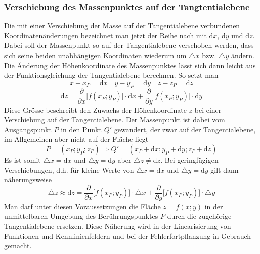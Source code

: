 \subsubsection{Verschiebung des Massenpunktes auf der Tangtentialebene}
Die mit einer Verschiebung der Masse auf der Tangentialebene verbundenen Koordinatenänderungen bezeichnet man jetzt der Reihe nach mit $\text{d}x$, $\text{d}y$ und $\text{d}z$. Dabei soll der Massenpunkt so auf der Tangentialebene verschoben werden, dass sich seine beiden unabhängigen Koordinaten wiederum um $\triangle x$ bzw. $\triangle y$ ändern.
\newline\newline 
Die Änderung der Höhenkoordinate des Massenpunktes lässt sich dann leicht aus der Funktionsgleichung der Tangentialebene berechnen. So setzt man
\begin{equation}
\boxed{x-x_P=\text{d}x}\quad \boxed{y-y_P=\text{d}y}\quad \boxed{z-z_P=\text{d}z}
\end{equation}
\begin{equation}
\boxed{\text{d}z=\dfrac{\partial}{\partial x}\Big[f\left(x_P; y_P\right)\Big]\cdot \text{d}x+\dfrac{\partial}{\partial y}\Big[f\left(x_P; y_P\right)\Big]\cdot \text{d}y}
\end{equation}
Diese Grösse beschreibt den Zuwachs der Höhenkoordinate $z$ bei einer Verschiebung auf der Tangentialebene. Der Massenpunkt ist dabei vom Ausgangspunkt $P$ in den Punkt $Q'$ gewandert, der zwar auf der Tangentialebene, im Allgemeinen aber nicht auf der Fläche liegt
\begin{equation} 
\boxed{P=\left(x_P; y_P; z_P\right)\Longrightarrow Q'=\left(x_P+\text{d}x; y_P+\text{d}y; z_P+\text{d}z\right)}
\end{equation} 
Es ist somit $\triangle x = \text{d}x$ und $\triangle y = \text{d}y$ aber $\triangle z \neq \text{d}z$. Bei geringfügigen Verschiebungen, d.h. für kleine Werte von $\triangle x = \text{d}x$ und $\triangle y = \text{d}y$ gilt dann näherungsweise
\begin{equation}
\boxed{\triangle z\approx \text{d}z=\dfrac{\partial}{\partial x}\Big[f\left(x_P; y_P\right)\Big]\cdot \triangle x+\dfrac{\partial}{\partial y}\Big[f\left(x_P; y_P\right)\Big]\cdot \triangle y}
\end{equation}
Man darf unter diesen Voraussetzungen die Fläche $z=f\left(x; y\right)$ in der unmittelbaren Umgebung des Berührungspunktes $P$ durch die zugehörige Tangentialebene ersetzen. Diese Näherung wird in der Linearisierung von Funktionen und Kennlinienfeldern und bei der Fehlerfortpflanzung in Gebrauch gemacht.
